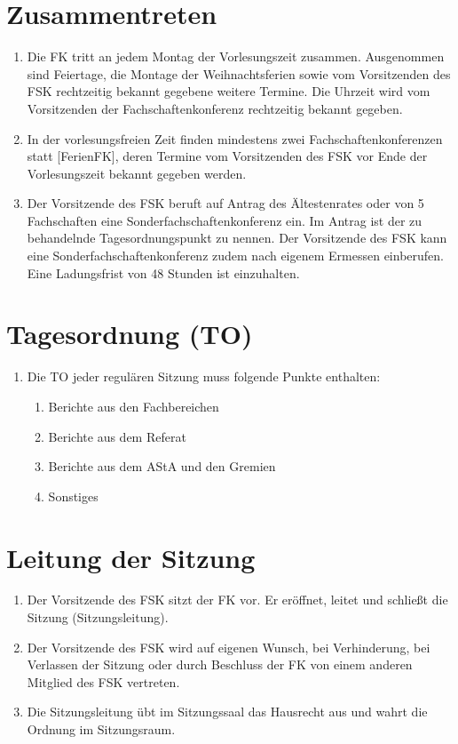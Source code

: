 \documentclass{article}
\begin{document}
\section{Zusammentreten}
\begin{enumerate}[(1)]
    \item Die FK tritt an jedem Montag der Vorlesungszeit zusammen.
    	Ausgenommen sind Feiertage,  die Montage der Weihnachtsferien sowie vom Vorsitzenden des FSK rechtzeitig bekannt gegebene weitere Termine.
    	Die Uhrzeit wird vom Vorsitzenden der Fachschaftenkonferenz rechtzeitig bekannt gegeben.
    \item In der vorlesungsfreien Zeit finden mindestens zwei Fachschaftenkonferenzen statt [FerienFK], deren Termine vom Vorsitzenden des FSK vor Ende der Vorlesungszeit bekannt gegeben werden.
    \item Der Vorsitzende des FSK beruft auf Antrag des Ältestenrates oder von 5 Fachschaften eine Sonderfachschaftenkonferenz ein.
    	Im Antrag ist der zu behandelnde Tagesordnungspunkt zu nennen. 
    	Der Vorsitzende des FSK kann eine Sonderfachschaftenkonferenz zudem nach eigenem Ermessen einberufen. 
    	Eine Ladungsfrist von 48 Stunden ist einzuhalten.    
\end{enumerate}

\section{Tagesordnung (TO)}
\begin{enumerate}[(1)]
    \item Die TO jeder regulären Sitzung muss folgende Punkte enthalten:
    \begin{enumerate}[1.]
        \item Berichte aus den Fachbereichen
        \item Berichte aus dem Referat
        \item Berichte aus dem AStA und den Gremien
        \item Sonstiges
    \end{enumerate}
\end{enumerate}

\section{Leitung der Sitzung}
\begin{enumerate}[(1)]
    \item Der Vorsitzende des FSK sitzt der FK vor. 
    	Er eröffnet, leitet und schließt die Sitzung (Sitzungsleitung).
    \item Der Vorsitzende des FSK wird auf eigenen Wunsch, bei Verhinderung, bei Verlassen der Sitzung oder durch Beschluss der FK von einem anderen Mitglied des FSK vertreten.
    \item Die Sitzungsleitung übt im Sitzungssaal das Hausrecht aus und wahrt die Ordnung im Sitzungsraum.
\end{enumerate}
\end{document}
